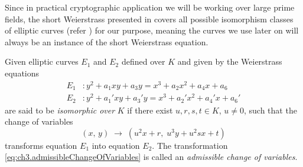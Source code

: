 
Since in practical cryptographic application we will be working over large prime fields, the short Weierstrass presented in  covers all possible isomorphism classes of elliptic curves (refer ) for our purpose, meaning the curves we use later on will always be an instance of the short Weierstrass equation. 

\begin{definition}
	\label{def:ch03.isomorphicEllipticCurves}
	Given elliptic curves $E_1$ and $E_2$ defined over $K$ and given by the Weierstrass equations
	\begin{align}
		E_1 &: y^2 + a_1 xy + a_3 y = x^3 + a_2 x^2 + a_4 x + a_6 \label{eq:ch3.E1weierstrass}\\
		E_2 &: y^2 + a_1' xy + a_3' y = x^3 + a_2' x^2 + a_4' x + a_6' \label{eq:ch3.E2weierstrass}
	\end{align}
	are said to be \textit{isomorphic over} $K$ if there exist $u, r, s, t \in K$, $u \neq 0$, such
	that the change of variables
	\begin{equation}
		(x,\, y) \;\longrightarrow\; (u^2 x + r,\; u^3 y + u^2 sx + t)
		\label{eq:ch3.admissibleChangeOfVariables}
	\end{equation}
	transforms equation $E_1$ into equation $E_2$. The transformation
	\eqref{eq:ch3.admissibleChangeOfVariables} is called an \textit{admissible change of variables}.
\end{definition}



